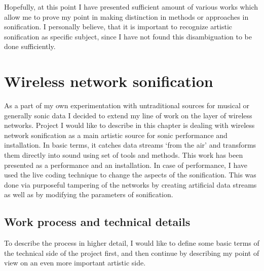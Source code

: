 \documentclass[12pt,a4paper,oneside]{report}
\begin{document}
Hopefully, at this point I have presented sufficient amount of various works which allow me to prove my point in making distinction in methods or approaches in sonification. I personally believe, that it is important to recognize artistic sonification as specific subject, since I have not found this disambiguation to be done sufficiently.

\section{Wireless network sonification}

As a part of my own experimentation with untraditional sources for musical or generally sonic data I decided to extend my line of work on the layer of wireless networks. Project I would like to describe in this chapter is dealing with wireless network sonification as a main artistic source for sonic performance and installation. In basic terms, it catches data streams `from the air' and transforms them directly into sound using set of tools and methods. This work has been presented as a performance and an installation. In case of performance, I have used the live coding technique to change the aspects of the sonification. This was done via purposeful tampering of the networks by creating artificial data streams as well as by modifying the parameters of sonification.

\subsection{Work process and technical details}

To describe the process in higher detail, I would like to define some basic terms of the technical side of the project first, and then continue by describing my point of view on an even more important artistic side.
\end{document}

